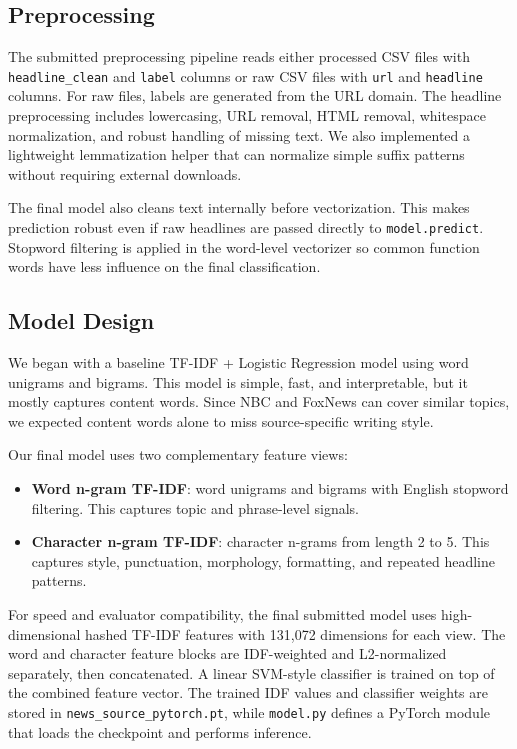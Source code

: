 \documentclass[10pt]{article}
\begin{document}
\subsection{Preprocessing}
The submitted preprocessing pipeline reads either processed CSV files with \texttt{headline\_clean} and \texttt{label} columns or raw CSV files with \texttt{url} and \texttt{headline} columns. For raw files, labels are generated from the URL domain. The headline preprocessing includes lowercasing, URL removal, HTML removal, whitespace normalization, and robust handling of missing text. We also implemented a lightweight lemmatization helper that can normalize simple suffix patterns without requiring external downloads.

The final model also cleans text internally before vectorization. This makes prediction robust even if raw headlines are passed directly to \texttt{model.predict}. Stopword filtering is applied in the word-level vectorizer so common function words have less influence on the final classification.

\subsection{Model Design}
We began with a baseline TF-IDF + Logistic Regression model using word unigrams and bigrams. This model is simple, fast, and interpretable, but it mostly captures content words. Since NBC and FoxNews can cover similar topics, we expected content words alone to miss source-specific writing style.

Our final model uses two complementary feature views:
\begin{itemize}
    \item \textbf{Word n-gram TF-IDF}: word unigrams and bigrams with English stopword filtering. This captures topic and phrase-level signals.
    \item \textbf{Character n-gram TF-IDF}: character n-grams from length 2 to 5. This captures style, punctuation, morphology, formatting, and repeated headline patterns.
\end{itemize}

For speed and evaluator compatibility, the final submitted model uses high-dimensional hashed TF-IDF features with 131,072 dimensions for each view. The word and character feature blocks are IDF-weighted and L2-normalized separately, then concatenated. A linear SVM-style classifier is trained on top of the combined feature vector. The trained IDF values and classifier weights are stored in \texttt{news\_source\_pytorch.pt}, while \texttt{model.py} defines a PyTorch module that loads the checkpoint and performs inference.
\end{document}
